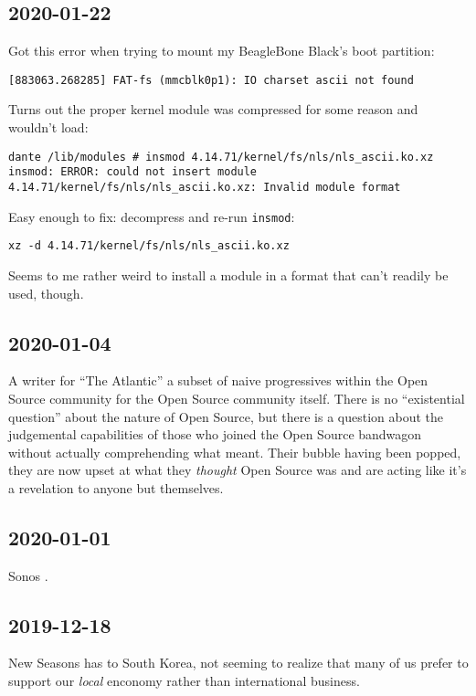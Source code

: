 \documentclass{article}
\begin{document}
\subsection{2020-01-22}
Got this error when trying to mount my BeagleBone Black's boot partition:
\begin{verbatim}
[883063.268285] FAT-fs (mmcblk0p1): IO charset ascii not found
\end{verbatim}
Turns out the proper kernel module was compressed for some reason and wouldn't load:
\begin{verbatim}
dante /lib/modules # insmod 4.14.71/kernel/fs/nls/nls_ascii.ko.xz
insmod: ERROR: could not insert module 4.14.71/kernel/fs/nls/nls_ascii.ko.xz: Invalid module format
\end{verbatim}
Easy enough to fix: decompress and re-run \texttt{insmod}:
\begin{verbatim}
xz -d 4.14.71/kernel/fs/nls/nls_ascii.ko.xz
\end{verbatim}
Seems to me rather weird to install a module in a format that can't readily be used, though.

\subsection{2020-01-04}
A writer for ``The Atlantic''  a subset of naive progressives within the Open Source community for the Open Source community itself.  There is no ``existential question'' about the nature of Open Source, but there is a question about the judgemental capabilities of those who joined the Open Source bandwagon without actually comprehending what  meant.  Their bubble having been popped, they are now upset at what they \emph{thought} Open Source was and are acting like it's a revelation to anyone but themselves.

\subsection{2020-01-01}
Sonos .

\subsection{2019-12-18}
New Seasons has   to South Korea, not seeming to realize that many of us prefer to support our \emph{local} enconomy rather than international business.
\end{document}
